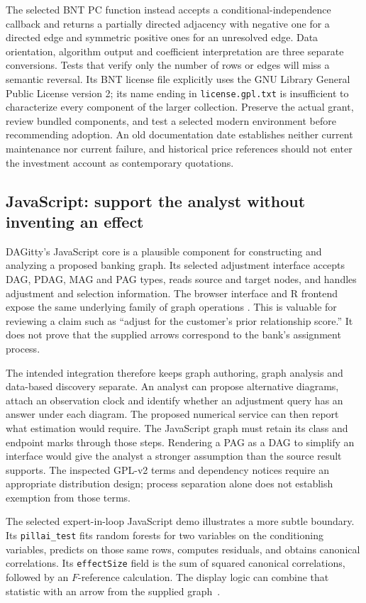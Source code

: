 The selected BNT PC function instead accepts a conditional-independence
callback and returns a partially directed adjacency with negative one for
a directed edge and symmetric positive ones for an unresolved edge.
Data orientation, algorithm output and coefficient interpretation are three
separate conversions. Tests that verify only the number of rows or edges
will miss a semantic reversal. Its BNT license file explicitly uses the GNU
Library General Public License version 2; its name ending in
\texttt{license.gpl.txt} is insufficient to characterize every component of
the larger collection. Preserve the actual grant, review bundled components,
and test a selected modern environment before recommending adoption.
An old documentation date establishes neither current maintenance nor
current failure, and historical price references should not enter the
investment account as contemporary quotations.

\subsection{JavaScript: support the analyst without inventing an effect}

DAGitty's JavaScript core is a plausible component for constructing and
analyzing a proposed banking graph. Its selected adjustment interface
accepts DAG, PDAG, MAG and PAG types, reads source and target nodes, and
handles adjustment and selection information. The browser interface and R
frontend expose the same underlying family of graph operations
\citep{exec13_other_dagitty}. This is valuable for reviewing a claim such as
``adjust for the customer's prior relationship score.'' It does not prove
that the supplied arrows correspond to the bank's assignment process.

The intended integration therefore keeps graph authoring, graph analysis
and data-based discovery separate. An analyst can propose alternative
diagrams, attach an observation clock and identify whether an adjustment
query has an answer under each diagram. The proposed numerical service can
then report what estimation would require. The JavaScript graph must retain
its class and endpoint marks through those steps. Rendering a PAG as a DAG
to simplify an interface would give the analyst a stronger assumption than
the source result supports. The inspected GPL-v2 terms and dependency
notices require an appropriate distribution design; process separation
alone does not establish exemption from those terms.

The selected expert-in-loop JavaScript demo illustrates a more subtle
boundary. Its \texttt{pillai\_test} fits random forests for two variables on
the conditioning variables, predicts on those same rows, computes residuals,
and obtains canonical correlations. Its \texttt{effectSize} field is the
sum of squared canonical correlations, followed by an $F$-reference
calculation. The display logic can combine that statistic with an arrow from
the supplied graph~\citep{exec13_other_webapp}.

